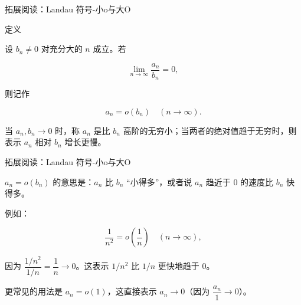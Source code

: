 \documentclass[aspectratio=169,10pt,fontset=fandol]{ctexbeamer}
\begin{document}
\begin{frame}[t,fragile]{拓展阅读：Landau 符号-小o与大O}
\normalsize
\begin{block}{定义}
{\normalsize


设 \(b_n\neq0\) 对充分大的 \(n\) 成立。若

\[

\lim_{n\to\infty}\dfrac{a_n}{b_n}=0,

\]

则记作

\[

a_n = o(b_n) \quad (n \to \infty).

\]

当 \(a_n,b_n\to0\) 时，称 \(a_n\) 是比 \(b_n\) 高阶的无穷小；当两者的绝对值趋于无穷时，则表示 \(a_n\) 相对 \(b_n\) 增长更慢。


}
\end{block}
\end{frame}
\begin{frame}[t,fragile]{拓展阅读：Landau 符号-小o与大O}
\normalsize
{\normalsize
\(a_n = o(b_n)\) 的意思是：\(a_n\) 比 \(b_n\) “小得多”，或者说 \(a_n\) 趋近于 0 的速度比 \(b_n\) 快得多。



例如：

\[

\dfrac{1}{n^2} = o\left(\dfrac{1}{n}\right) \quad (n \to \infty),

\]

因为 \(\dfrac{1/n^2}{1/n} = \dfrac{1}{n} \to 0\)。这表示 \(1/n^2\) 比 \(1/n\) 更快地趋于 0。



更常见的用法是 \(a_n = o(1)\)，这直接表示 \(a_n \to 0\)（因为 \(\dfrac{a_n}{1} \to 0\)）。


}
\end{frame}
\end{document}
